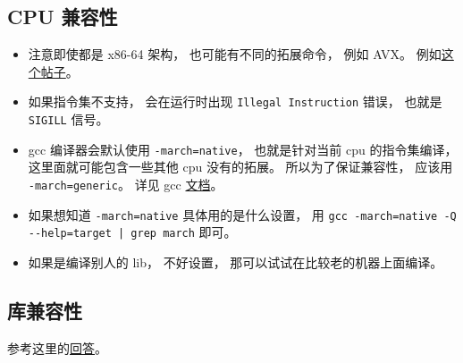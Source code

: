 
\begin{issues}
\issueDraft
\end{issues}


\subsection{CPU 兼容性}

\begin{itemize}
\item 注意即使都是 x86-64 架构， 也可能有不同的拓展命令， 例如 AVX。 例如\href{https://stackoverflow.com/questions/50945287/illegal-instruction-when-run-precompiled-program-on-other-machine}{这个帖子}。
\item 如果指令集不支持， 会在运行时出现 \verb|Illegal Instruction| 错误， 也就是 \verb|SIGILL| 信号。
\item gcc 编译器会默认使用 \verb|-march=native|， 也就是针对当前 cpu 的指令集编译， 这里面就可能包含一些其他 cpu 没有的拓展。 所以为了保证兼容性， 应该用 \verb|-march=generic|。 详见 gcc \href{https://gcc.gnu.org/onlinedocs/gcc/x86-Options.html}{文档}。
\item 如果想知道 \verb|-march=native| 具体用的是什么设置， 用 \verb`gcc -march=native -Q --help=target | grep march` 即可。
\item 如果是编译别人的 lib， 不好设置， 那可以试试在比较老的机器上面编译。
\end{itemize}

\subsection{库兼容性}
参考这里的\href{https://stackoverflow.com/questions/20183883/determining-binary-compatibility-under-linux}{回答}。

